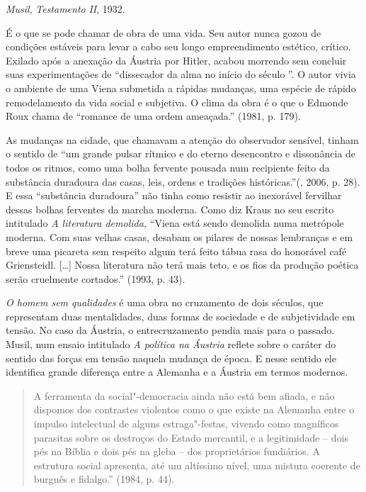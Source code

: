 \emph{Musil}, \emph{Testamento} \emph{II}, 1932.

É o que se pode chamar de obra de uma vida. Seu autor nunca gozou de
condições estáveis para levar a cabo seu longo empreendimento estético,
crítico. Exilado após a anexação da Áustria por Hitler, acabou morrendo
sem concluir suas experimentações de ``dissecador da alma no início do
século ''. O autor vivia o ambiente de uma Viena submetida a rápidas
mudanças, uma espécie de rápido remodelamento da vida social e
subjetiva. O clima da obra é o que o Edmonde Roux chama de ``romance de
uma ordem ameaçada.'' (1981, p. 179).

As mudanças na cidade, que chamavam a atenção do observador sensível,
tinham o sentido de ``um grande pulsar rítmico e do eterno desencontro e
dissonância de todos os ritmos, como uma bolha fervente pousada num
recipiente feito da substância duradoura das casas, leis, ordens e
tradições históricas.''(, 2006, p. 28). E essa ``substância
duradoura'' não tinha como resistir ao inexorável fervilhar dessas
bolhas ferventes da marcha moderna. Como diz Kraus no seu escrito
intitulado \emph{A literatura demolida,} ``Viena está sendo demolida
numa metrópole moderna. Com suas velhas casas, desabam os pilares de
nossas lembranças e em breve uma picareta sem respeito algum terá feito
tábua rasa do honorável café Griensteidl. [\ldots{}] Nossa
literatura não terá mais teto, e os fios da produção poética serão
cruelmente cortados.'' (1993, p. 43).

\emph{O homem sem qualidades} é uma obra no cruzamento de dois séculos,
que representam duas mentalidades, duas formas de sociedade e de
subjetividade em tensão. No caso da Áustria, o entrecruzamento pendia
mais para o passado. Musil, num ensaio intitulado \emph{A política na
Áustria} reflete sobre o caráter do sentido das forças em tensão naquela
mudança de época. E nesse sentido ele identifica grande diferença entre
a Alemanha e a Áustria em termos modernos.

\begin{quote}
A ferramenta da social"-democracia ainda não está bem afiada, e não
dispomos dos contrastes violentos como o que existe na Alemanha entre o
impulso intelectual de alguns estraga"-festas, vivendo como magníficos
parasitas sobre os destroços do Estado mercantil, e a legitimidade --
dois pés na Bíblia e dois pés na gleba -- dos proprietários fundiários.
A estrutura social apresenta, até um altíssimo nível, uma mistura
coerente de burguês e fidalgo.'' (1984, p. 44).
\end{quote}

